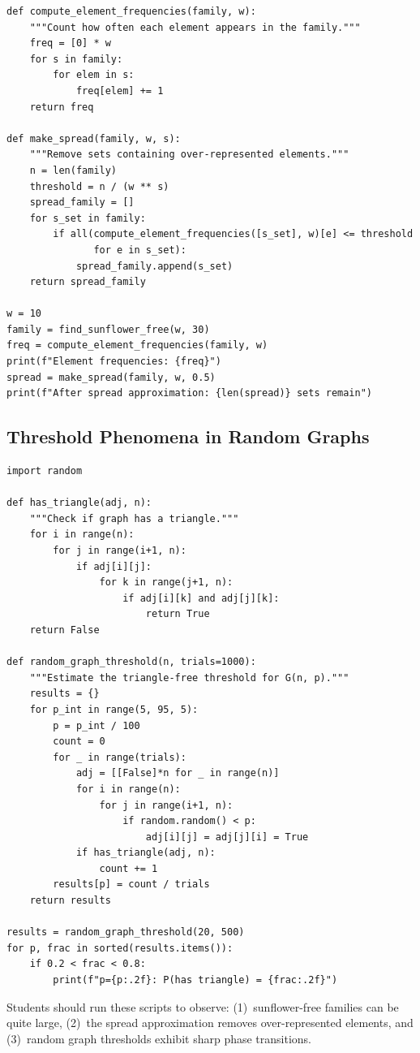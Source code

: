 \begin{verbatim}
def compute_element_frequencies(family, w):
    """Count how often each element appears in the family."""
    freq = [0] * w
    for s in family:
        for elem in s:
            freq[elem] += 1
    return freq

def make_spread(family, w, s):
    """Remove sets containing over-represented elements."""
    n = len(family)
    threshold = n / (w ** s)
    spread_family = []
    for s_set in family:
        if all(compute_element_frequencies([s_set], w)[e] <= threshold
               for e in s_set):
            spread_family.append(s_set)
    return spread_family

w = 10
family = find_sunflower_free(w, 30)
freq = compute_element_frequencies(family, w)
print(f"Element frequencies: {freq}")
spread = make_spread(family, w, 0.5)
print(f"After spread approximation: {len(spread)} sets remain")
\end{verbatim}

\subsection{Threshold Phenomena in Random Graphs}

\begin{verbatim}
import random

def has_triangle(adj, n):
    """Check if graph has a triangle."""
    for i in range(n):
        for j in range(i+1, n):
            if adj[i][j]:
                for k in range(j+1, n):
                    if adj[i][k] and adj[j][k]:
                        return True
    return False

def random_graph_threshold(n, trials=1000):
    """Estimate the triangle-free threshold for G(n, p)."""
    results = {}
    for p_int in range(5, 95, 5):
        p = p_int / 100
        count = 0
        for _ in range(trials):
            adj = [[False]*n for _ in range(n)]
            for i in range(n):
                for j in range(i+1, n):
                    if random.random() < p:
                        adj[i][j] = adj[j][i] = True
            if has_triangle(adj, n):
                count += 1
        results[p] = count / trials
    return results

results = random_graph_threshold(20, 500)
for p, frac in sorted(results.items()):
    if 0.2 < frac < 0.8:
        print(f"p={p:.2f}: P(has triangle) = {frac:.2f}")
\end{verbatim}

\begin{highlightbox}
Students should run these scripts to observe: (1)~sunflower-free families can be quite large, (2)~the spread approximation removes over-represented elements, and (3)~random graph thresholds exhibit sharp phase transitions.
\end{highlightbox}

